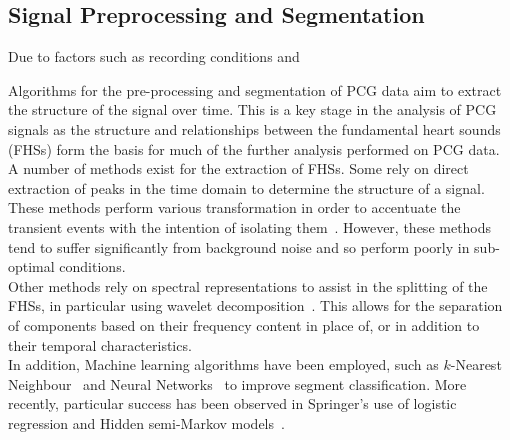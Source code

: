 \documentclass[titlepage, 12pt]{scrartcl} \usepackage{enumitem}
\begin{document}
\subsection{Signal Preprocessing and Segmentation}
Due to factors such as recording conditions and 

Algorithms for the pre-processing and segmentation of PCG data
aim to  extract the structure of the signal over time. This is a key
stage in the analysis of PCG signals as the structure and relationships between the
fundamental heart sounds (FHSs) form the basis for much of the further
analysis performed on PCG data. A number of methods exist for the
extraction of FHSs. Some rely on direct extraction of peaks in the time
domain to determine the structure of a signal. These methods perform
various transformation in order to accentuate the transient events with
the intention of isolating them~\parencite{Groch1992, Liang1997}.
However, these methods tend to suffer significantly from background
noise and so perform poorly in sub-optimal conditions.\\
Other methods rely on spectral representations to assist in the
splitting of the FHSs, in particular using wavelet
decomposition~\parencite{LiangHuiying1997, Vepa2008}. This allows for
the separation of components based on their frequency content in place
of, or in addition to their temporal characteristics.\\
In addition, Machine learning algorithms have been employed, such as
$k$-Nearest Neighbour~\parencite{Gupta2007} and Neural
Networks~\parencite{Oskiper2002} to improve segment classification.
More recently, particular success has been observed in Springer's use
of logistic regression and Hidden semi-Markov
models~\citeyearpar{Springer2016}.
\end{document}
